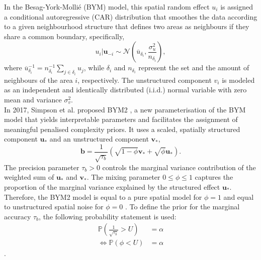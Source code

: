 In the Besag-York-Mollié (BYM) \autocite[][]{besag1991bayesian} model, this spatial random effect $u_i$ is assigned a conditional autoregressive (CAR) distribution that smoothes the data according to a given neighbourhood structure that defines two areas as neighbours if they share a common boundary, specifically,
\begin{equation}
    u_i|\pmb{u}_{-i}\sim\mathcal{N}\left(\overline{u}_{\delta_i}, \frac{\sigma_u^2}{n_{\delta_i}}\right),
\end{equation}
where $\overline{u}_{\delta_i}^{-1}=n_{\delta_i}^{-1}\sum_{j\in\delta_i} u_j$, while $\delta_i$ and $n_{\delta_i}$ represent the set and the amount of neighbours of the area $i$, respectively. The unstructured component $v_i$ is modeled as an independent and identically distributed (i.i.d.) normal variable with zero mean and variance $\sigma_v^2$. \\
In 2017, Simpson et al. proposed BYM2 \autocite[][]{simpson2017penalising}, a new parameterisation of the BYM model that yields interpretable parameters and facilitates the assignment of meaningful penalised complexity priors. It uses a scaled, spatially structured component $\pmb{u_*}$ and an unstructured component $\pmb{v_*}$,
\begin{equation}
    \pmb{b}=\frac{1}{\sqrt{\tau_b}}\left(\sqrt{1-\phi}\pmb{v_*}+\sqrt{\phi}\pmb{u_*}\right).
\end{equation}
The precision parameter $\tau_b > 0$ controls the marginal variance contribution of the weighted sum of $\pmb{u_*}$ and $\pmb{v_*}$. The mixing parameter $0\leq\phi\leq1$ captures the proportion of the marginal variance explained by the structured effect $\pmb{u}_*$. Therefore, the BYM2 model is equal to a pure spatial model for $\phi=1$ and equal to unstructured spatial noise for $\phi=0$ \autocite[][]{riebler2016intuitive}. To define the prior for the marginal accuracy $\tau_b$, the following probability statement is used:
\begin{align}
    \mathbb{P}\left(\frac{1}{\sqrt{\tau_b}}>U\right)&=\alpha\nonumber\\
    \Longleftrightarrow\mathbb{P}\left(\phi <U\right)&=\alpha
\end{align}
\autocite[][]{moraga2019geospatial}.
